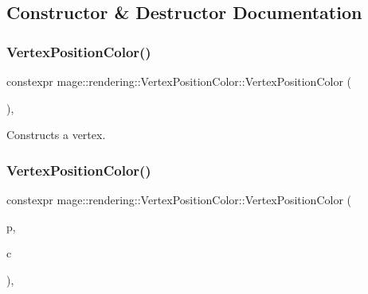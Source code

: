 \subsection{Constructor \& Destructor Documentation}
\hypertarget{structmage_1_1rendering_1_1_vertex_position_color_a2491463aecd8969ed33f85b41a0887c5}{}\label{structmage_1_1rendering_1_1_vertex_position_color_a2491463aecd8969ed33f85b41a0887c5} 
\subsubsection{\texorpdfstring{Vertex\+Position\+Color()}{VertexPositionColor()}\hspace{0.1cm}{\footnotesize\ttfamily [1/4]}}
{\footnotesize\ttfamily constexpr mage\+::rendering\+::\+Vertex\+Position\+Color\+::\+Vertex\+Position\+Color (\begin{DoxyParamCaption}{ }\end{DoxyParamCaption})\hspace{0.3cm}{\ttfamily [default]}, {\ttfamily [noexcept]}}

Constructs a vertex. \hypertarget{structmage_1_1rendering_1_1_vertex_position_color_ad98b1ccfc9506f70e574a99a330aa989}{}\label{structmage_1_1rendering_1_1_vertex_position_color_ad98b1ccfc9506f70e574a99a330aa989} 
\subsubsection{\texorpdfstring{Vertex\+Position\+Color()}{VertexPositionColor()}\hspace{0.1cm}{\footnotesize\ttfamily [2/4]}}
{\footnotesize\ttfamily constexpr mage\+::rendering\+::\+Vertex\+Position\+Color\+::\+Vertex\+Position\+Color (\begin{DoxyParamCaption}\item[{\hyperlink{structmage_1_1_point3}{Point3}}]{p,  }\item[{\hyperlink{structmage_1_1_s_r_g_b_a}{S\+R\+G\+BA}}]{c }\end{DoxyParamCaption})\hspace{0.3cm}{\ttfamily [explicit]}, {\ttfamily [noexcept]}}


